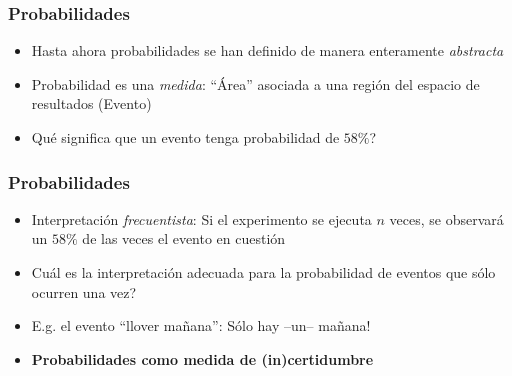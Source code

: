 \documentclass[xcolor=dvipsnames,10pt]{beamer}
\begin{document}
%
\begin{frame}
  \frametitle{Probabilidades}
  \begin{itemize}
  \item Hasta ahora probabilidades se han definido de manera enteramente \emph{abstracta}
  \item Probabilidad es una \emph{medida}: ``Área'' asociada a una región del espacio de resultados (Evento)
  \item Qué significa que un evento tenga probabilidad de $58 \%$?
  \end{itemize}
\end{frame}
%
\begin{frame}
  \frametitle{Probabilidades}
  \begin{itemize}
  \item Interpretación \emph{frecuentista}: Si el experimento se ejecuta $n$ veces, se observará un $58 \%$ de las veces el evento en cuestión
    \pause
  \item Cuál es la interpretación adecuada para la probabilidad de eventos que sólo ocurren una vez?
  \item E.g. el evento ``llover mañana'': Sólo hay --un-- mañana!
    \pause
  \item \textbf{Probabilidades como medida de (in)certidumbre}
  \end{itemize}
\end{frame}
%
\end{document}
